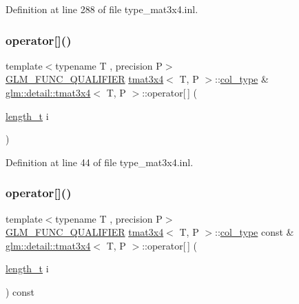 Definition at line 288 of file type\+\_\+mat3x4.\+inl.

\mbox{\label{structglm_1_1detail_1_1tmat3x4_a787deb7b8f8d3d0f2e1e5df0c6f47bc7}} 
\subsubsection{\texorpdfstring{operator[]()}{operator[]()}\hspace{0.1cm}{\footnotesize\ttfamily [1/2]}}
{\footnotesize\ttfamily template$<$typename T , precision P$>$ \\
\hyperlink{setup_8hpp_a33fdea6f91c5f834105f7415e2a64407}{G\+L\+M\+\_\+\+F\+U\+N\+C\+\_\+\+Q\+U\+A\+L\+I\+F\+I\+ER} \hyperlink{structglm_1_1detail_1_1tmat3x4}{tmat3x4}$<$ T, P $>$\+::\hyperlink{structglm_1_1detail_1_1tmat3x4_aadea597c799e263c7580c0291753d0de}{col\+\_\+type} \& \hyperlink{structglm_1_1detail_1_1tmat3x4}{glm\+::detail\+::tmat3x4}$<$ T, P $>$\+::operator\mbox{[}$\,$\mbox{]} (\begin{DoxyParamCaption}\item[{\hyperlink{namespaceglm_a090a0de2260835bee80e71a702492ed9}{length\+\_\+t}}]{i }\end{DoxyParamCaption})}



Definition at line 44 of file type\+\_\+mat3x4.\+inl.

\mbox{\label{structglm_1_1detail_1_1tmat3x4_a2ff4188b552107abbd7b74a7a58d1802}} 
\subsubsection{\texorpdfstring{operator[]()}{operator[]()}\hspace{0.1cm}{\footnotesize\ttfamily [2/2]}}
{\footnotesize\ttfamily template$<$typename T , precision P$>$ \\
\hyperlink{setup_8hpp_a33fdea6f91c5f834105f7415e2a64407}{G\+L\+M\+\_\+\+F\+U\+N\+C\+\_\+\+Q\+U\+A\+L\+I\+F\+I\+ER} \hyperlink{structglm_1_1detail_1_1tmat3x4}{tmat3x4}$<$ T, P $>$\+::\hyperlink{structglm_1_1detail_1_1tmat3x4_aadea597c799e263c7580c0291753d0de}{col\+\_\+type} const  \& \hyperlink{structglm_1_1detail_1_1tmat3x4}{glm\+::detail\+::tmat3x4}$<$ T, P $>$\+::operator\mbox{[}$\,$\mbox{]} (\begin{DoxyParamCaption}\item[{\hyperlink{namespaceglm_a090a0de2260835bee80e71a702492ed9}{length\+\_\+t}}]{i }\end{DoxyParamCaption}) const}



